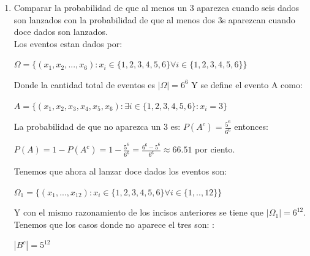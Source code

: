 \documentclass[12pt,a4paper]{report}
\begin{document}
\begin{enumerate}
{\begin{enumerate}[label=\alph*) ]
{Al tirar dos dados hay así $6^2$ posibilidades y al ser 24 tiros son $(6^2)^{24}$ posibilidades. La probabilidad de que no se obtenga ningun doble cinco esta dada por:\\
\begin{center}
$P(B^c)= \frac{(5^2)^{24}}{(6^2)^{24}}=(\frac{25}{36})^{24}$
\end{center}
Entonces la probabilidad de que salga al menos un doble 5 es:\\
\begin{center}
$1-(\frac{25}{36})^{24}=\frac{1}{1}-\frac{5^{48}}{6^{48}}=\frac{6^{48}-5^{48}}{6^{48}}\approx 99.98$ por ciento.
\end{center}
    } 
    \item{Comparar la probabilidad de que al menos un 3 aparezca cuando seis dados son lanzados con la probabilidad de que al menos dos 3s aparezcan cuando doce dados son lanzados.\\
    Los eventos estan dados por: \\
    \begin{center}
    $\Omega = \lbrace (x_{1},x_{2},...,x_{6}): x_{i}\in \lbrace 1,2,3,4,5,6\rbrace \forall i\in \lbrace 1,2,3,4,5,6 \rbrace \rbrace$
    \end{center}
    Donde la cantidad total de eventos es $|\Omega|=6^6$
    Y se define el evento A como:\\
    \begin{center}
    $A = \lbrace (x_{1},x_{2},x_{3},x_{4},x_{5},x_{6}):\exists i\in \lbrace 1,2,3,4,5,6 \rbrace : x_{i}=3 \rbrace$
    \end{center}
    La probabilidad de que no aparezca un 3 es: $P(A^c)= \frac{5^6}{6^6}$ entonces: \\
    \begin{center}
    $P(A)=1-P(A^c)=1-\frac{5^6}{6^6}=\frac{6^6-5^6}{6^6}\approx 66.51 $ por ciento.
    \end{center}
    Tenemos que ahora al lanzar doce dados los eventos son:\\
    \begin{center}
    $\Omega_{1}= \lbrace (x_{1},...,x_{12}): x_{i}\in \lbrace 1,2,3,4,5,6 \rbrace \forall i \in \lbrace 1,..,12 \rbrace \rbrace$
    \end{center}
    Y con el mismo razonamiento de los incisos anteriores se tiene que $|\Omega_{1}|=6^{12}$. Tenemos que los casos donde no aparece el tres son: :\\
    \begin{center}
    $|B^c|= 5^{12}$

\end{center}}
\end{enumerate}}
\end{enumerate}
\end{document}
